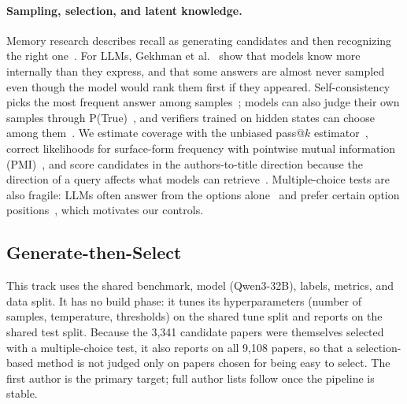 \paragraph{Sampling, selection, and latent knowledge.}
Memory research describes recall as generating candidates and then recognizing the right one~\cite{kintsch1970models,anderson1972recognition}. For LLMs, Gekhman et al.~\cite{gekhman2025insideout} show that models know more internally than they express, and that some answers are almost never sampled even though the model would rank them first if they appeared. Self-consistency picks the most frequent answer among samples~\cite{wang2023selfconsistency}; models can also judge their own samples through P(True)~\cite{kadavath2022language}, and verifiers trained on hidden states can choose among them~\cite{orgad2025llms}. We estimate coverage with the unbiased pass@$k$ estimator~\cite{chen2021codex}, correct likelihoods for surface-form frequency with pointwise mutual information (PMI)~\cite{holtzman2021surface}, and score candidates in the authors-to-title direction because the direction of a query affects what models can retrieve~\cite{berglund2024reversal}. Multiple-choice tests are also fragile: LLMs often answer from the options alone~\cite{balepur2024artifacts} and prefer certain option positions~\cite{zheng2024mcq}, which motivates our controls.


\subsection{Generate-then-Select}

This track uses the shared benchmark, model (Qwen3-32B), labels, metrics, and data split. It has no build phase: it tunes its hyperparameters (number of samples, temperature, thresholds) on the shared tune split and reports on the shared test split. Because the 3,341 candidate papers were themselves selected with a multiple-choice test, it also reports on all 9,108 papers, so that a selection-based method is not judged only on papers chosen for being easy to select. The first author is the primary target; full author lists follow once the pipeline is stable.

